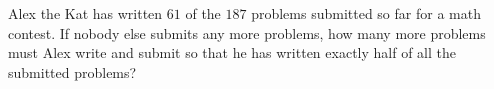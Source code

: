 Alex the Kat has written $61$ of the $187$ problems submitted so far for a math contest. If nobody else submits any more problems, how many more problems must Alex write and submit so that he has written exactly half of all the submitted problems?
